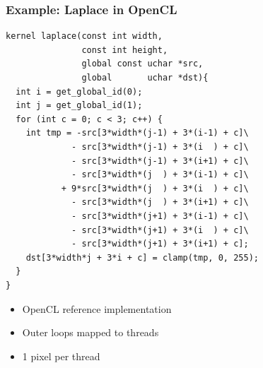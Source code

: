 \documentclass{beamer}
\begin{document}
\begin{frame}[fragile]
  \frametitle{Example: Laplace in OpenCL}
\tiny
{}
\begin{lstlisting}
kernel laplace(const int width,
               const int height,
               global const uchar *src,
               global       uchar *dst){
  int i = get_global_id(0);
  int j = get_global_id(1);
  for (int c = 0; c < 3; c++) {
    int tmp = -src[3*width*(j-1) + 3*(i-1) + c]\
             - src[3*width*(j-1) + 3*(i  ) + c]\
             - src[3*width*(j-1) + 3*(i+1) + c]\
             - src[3*width*(j  ) + 3*(i-1) + c]\
           + 9*src[3*width*(j  ) + 3*(i  ) + c]\
             - src[3*width*(j  ) + 3*(i+1) + c]\
             - src[3*width*(j+1) + 3*(i-1) + c]\
             - src[3*width*(j+1) + 3*(i  ) + c]\
             - src[3*width*(j+1) + 3*(i+1) + c];
    dst[3*width*j + 3*i + c] = clamp(tmp, 0, 255);
  }
}
\end{lstlisting}
\begin{itemize}
\item OpenCL reference implementation
\item Outer loops mapped to threads
\item 1 pixel per thread
\end{itemize}
\end{frame}
\end{document}
